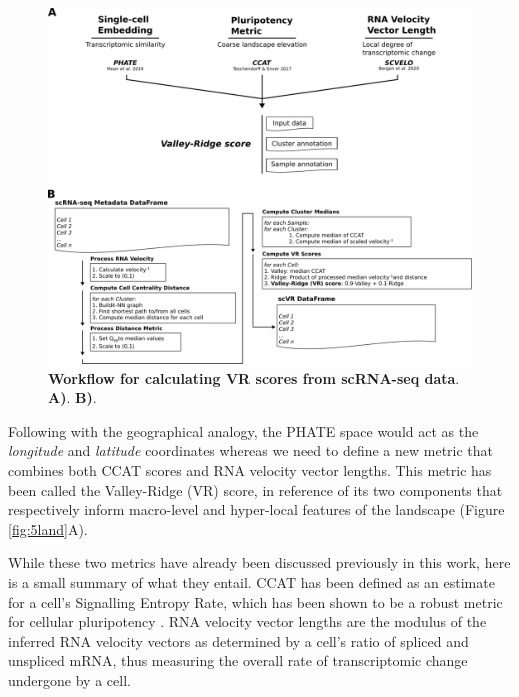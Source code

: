 \begin{figure}
    \centering
    \includegraphics{05vr/figs/5VR_score.png}
    \caption{\textbf{Workflow for calculating VR scores from scRNA-seq data}. \textbf{A)}. \textbf{B)}.}
    \label{fig:5score}
\end{figure}

Following with the geographical analogy, the PHATE space would act as the \emph{longitude} and \emph{latitude} coordinates whereas we need to define a new metric that combines both CCAT scores and RNA velocity vector lengths. This metric has been called the Valley-Ridge (VR) score, in reference of its two components that respectively inform macro-level and hyper-local features of the landscape (Figure \ref{fig:5land}A).

While these two metrics have already been discussed previously in this work, here is a small summary of what they entail. CCAT has been defined as an estimate for a cell's Signalling Entropy Rate, which has been shown to be a robust metric for cellular pluripotency \cite{teschendorff_single-cell_2017,chen_single-cell_2019,senra_origins_2022}. RNA velocity vector lengths are the modulus of the inferred RNA velocity vectors as determined by a cell's ratio of spliced and unspliced mRNA, thus measuring the overall rate of transcriptomic change undergone by a cell.


